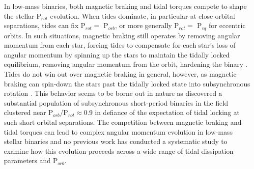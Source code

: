 In low-mass binaries, both magnetic braking and tidal torques compete to shape the stellar P$_{rot}$ evolution. When tides dominate, in particular at close orbital separations, tides can fix P$_{rot} =$ P$_{orb}$, or more generally P$_{rot} =$ P$_{eq}$ for eccentric orbits. In such situations, magnetic braking still operates by removing angular momentum from each star, forcing tides to compensate for each star's loss of angular momentum by spinning up the stars to maintain the tidally locked equilibrium, removing angular momentum from the orbit, hardening the binary \citep[][]{Verbunt1981,Repetto2014,Fleming2018}. Tides do not win out over magnetic braking in general, however, as magnetic braking can spin-down the stars past the tidally locked state into subsynchronous rotation \citep[P$_{rot} >$ P$_{eq}$, ][]{Habets1989,Zahn1994,Keppens1997}. This behavior seems to be borne out in nature as \citet{Lurie2017} discovered a substantial population of subsynchronous short-period binaries in the \kepler field clustered near P$_{orb}/$P$_{rot}{\approx} 0.9$ in defiance of the expectation of tidal locking at such short orbital separations. The competition between magnetic braking and tidal torques can lead to complex angular momentum evolution in low-mass stellar binaries and no previous work has conducted a systematic study to examine how this evolution proceeds across a wide range of tidal dissipation parameters and P$_{orb}$.

 
